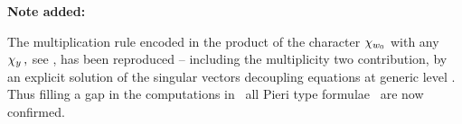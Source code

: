 \bigskip
{\bf Note added:}
\nref{}
\medskip

The multiplication rule encoded in the product of  the character
$\chi_{w_0}$  with any $\chi_{y}\,,$ see \fmt{}, has been
reproduced -- including the multiplicity two contribution, by an
explicit solution of the singular vectors decoupling equations at
generic level \GPW. Thus filling a gap in the computations in
\FGP\ all Pieri type formulae \fmt{}\ are now confirmed.



\bigskip
\listrefs
\bye

